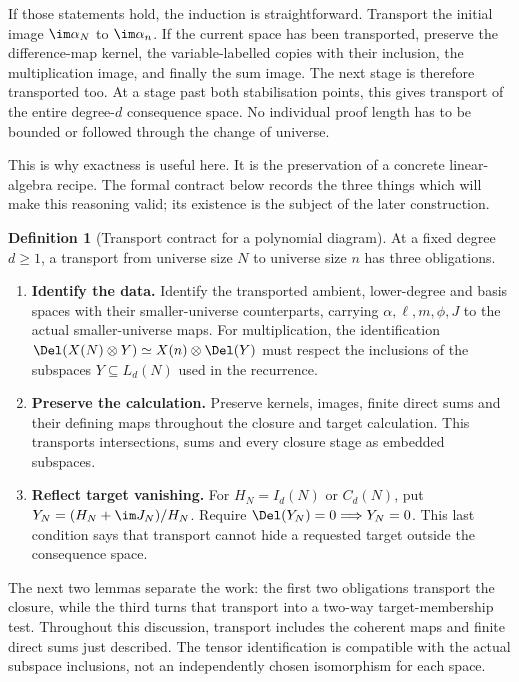 \documentclass[11pt,a4paper,oneside,openany]{book}
\theoremstyle{definition}\newtheorem{definition}[theorem]{Definition}
\theoremstyle{remark}\newtheorem{remark}[theorem]{Remark}
\numberwithin{equation}{chapter}
\begin{document}
If those statements hold, the induction is straightforward.
Transport the initial image $\im\alpha_N$ to $\im\alpha_n$.
If the current space has been transported, preserve the difference-map
kernel, the variable-labelled copies with their inclusion, the
multiplication image, and finally the sum image.
The next stage is therefore transported too.
At a stage past both stabilisation points, this gives transport of
the entire degree-$d$ consequence space.
No individual proof length has to be bounded or followed through the
change of universe.

This is why exactness is useful here. It is the preservation of a
concrete linear-algebra recipe. The formal contract below records the
three things which will make this reasoning valid; its existence
is the subject of the later construction.

\begin{definition}[Transport contract for a polynomial diagram]\label{tx:def:polynomial-diagram}
At a fixed degree $d\ge1$, a transport from universe size $N$ to universe size $n$
has three obligations.
\begin{enumerate}
\item \textbf{Identify the data.} Identify the transported ambient,
lower-degree and basis spaces with their smaller-universe counterparts,
carrying $\alpha,\ell,m,\phi,J$ to the actual smaller-universe maps.
For multiplication, the identification
$\Del(X(N)\otimes Y)\simeq X(n)\otimes\Del(Y)$ must respect the
inclusions of the subspaces $Y\subseteq L_d(N)$ used in the recurrence.
\item \textbf{Preserve the calculation.} Preserve kernels, images,
finite direct sums and their defining maps throughout the closure and
target calculation. This transports intersections, sums and every
closure stage as embedded subspaces.
\item \textbf{Reflect target vanishing.} For $H_N=I_d(N)$ or $C_d(N)$,
put $Y_N=(H_N+\im J_N)/H_N$. Require
$\Del(Y_N)=0\Longrightarrow Y_N=0$. This last condition says that
transport cannot hide a requested target outside the consequence space.
\end{enumerate}
\end{definition}

The next two lemmas separate the work: the first two obligations
transport the closure, while the third turns that transport into a
two-way target-membership test.
Throughout this discussion, transport includes the coherent maps and
finite direct sums just described. The tensor identification is
compatible with the actual subspace inclusions, not an independently
chosen isomorphism for each space.
\end{document}
